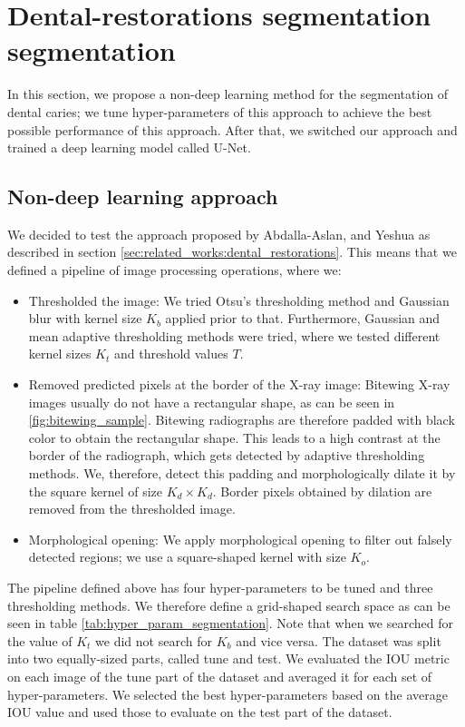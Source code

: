 \section{Dental-restorations segmentation segmentation}
\label{sec:methods:dental_restorations}
In this section, we propose a non-deep learning method for the segmentation of dental caries; we tune hyper-parameters of this approach to achieve the best possible performance of this approach. After that, we switched our approach and trained a deep learning model called U-Net.
\subsection{Non-deep learning approach}
We decided to test the approach proposed by Abdalla-Aslan, and Yeshua \cite{AbdallaAslan2020, Yeshua2019} as described in section \ref{sec:related_works:dental_restorations}. This means that we defined a pipeline of image processing operations, where we:
\begin{itemize}
    \item Thresholded the image: We tried Otsu's thresholding method and Gaussian blur with kernel size $K_b$ applied prior to that. Furthermore, Gaussian and mean adaptive thresholding methods were tried, where we tested different kernel sizes $K_t$ and threshold values $T$.
    \item Removed predicted pixels at the border of the X-ray image: Bitewing X-ray images usually do not have a rectangular shape, as can be seen in \ref{fig:bitewing_sample}. Bitewing radiographs are therefore padded with black color to obtain the rectangular shape. This leads to a high contrast at the border of the radiograph, which gets detected by adaptive thresholding methods. We, therefore, detect this padding and morphologically dilate it by the square kernel of size $K_d \times K_d$. Border pixels obtained by dilation are removed from the thresholded image.
    \item Morphological opening: We apply morphological opening to filter out falsely detected regions; we use a square-shaped kernel with size $K_o$.
\end{itemize}

The pipeline defined above has four hyper-parameters to be tuned and three thresholding methods. We therefore define a grid-shaped search space as can be seen in table \ref{tab:hyper_param_segmentation}. Note that when we searched for the value of $K_t$ we did not search for $K_b$ and vice versa.
The dataset was split into two equally-sized parts, called tune and test. We evaluated the IOU metric on each image of the tune part of the dataset and averaged it for each set of hyper-parameters. We selected the best hyper-parameters based on the average IOU value and used those to evaluate on the test part of the dataset.

